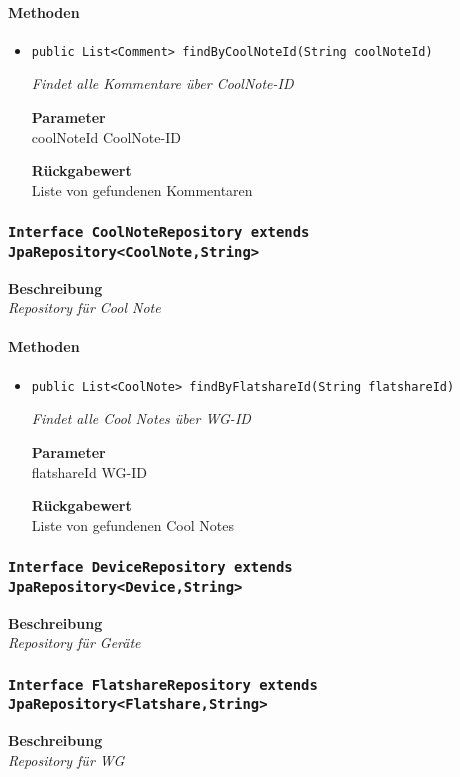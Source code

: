     \paragraph*{Methoden}
    \begin{itemize}
    	\item{\texttt{public List<Comment> findByCoolNoteId(String coolNoteId)}}
    	
    	\textit{Findet alle Kommentare über CoolNote-ID}
    	
    	\textbf{Parameter} \\
    	coolNoteId CoolNote-ID
    	
    	\textbf{Rückgabewert} \\
    	Liste von gefundenen Kommentaren
    \end{itemize}
    \subsubsection{\texttt{Interface CoolNoteRepository extends JpaRepository<CoolNote,String>}}
    \textbf{Beschreibung} \\
    \textit{Repository für Cool Note}
    \paragraph*{Methoden}
    \begin{itemize}
    	\item{\texttt{public List<CoolNote> findByFlatshareId(String flatshareId)}}
    	
    	\textit{Findet alle Cool Notes über WG-ID}
    	
    	\textbf{Parameter} \\
    	flatshareId WG-ID
    	
    	\textbf{Rückgabewert} \\
    	Liste von gefundenen Cool Notes
    \end{itemize}
    \subsubsection{\texttt{Interface DeviceRepository extends JpaRepository<Device,String>}}
    \textbf{Beschreibung} \\
    \textit{Repository für Geräte}
    \subsubsection{\texttt{Interface FlatshareRepository extends JpaRepository<Flatshare,String>}}
    \textbf{Beschreibung} \\
    \textit{Repository für WG}
